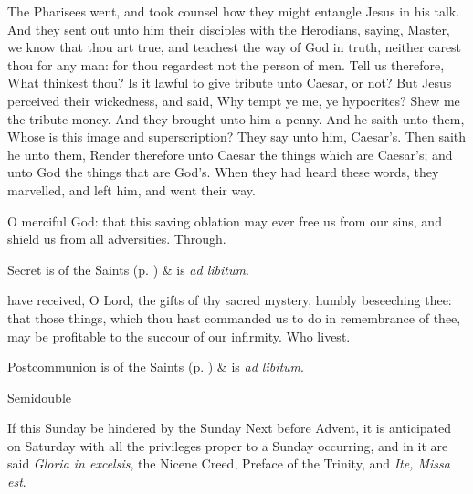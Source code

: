 
 The Pharisees went, and took counsel how they might entangle Jesus in his talk. And they sent out unto him their disciples with the Herodians, saying, Master, we know that thou art true, and teachest the way of God in truth, neither carest thou for any man: for thou regardest not the person of men. Tell us therefore, What thinkest thou? Is it lawful to give tribute unto Caesar, or not? But Jesus perceived their wickedness, and said, Why tempt ye me, ye hypocrites? Shew me the tribute money. And they brought unto him a penny. And he saith unto them, Whose is this image and superscription? They say unto him, Caesar's. Then saith he unto them, Render therefore unto Caesar the things which are Caesar's; and unto God the things that are God's. When they had heard these words, they marvelled, and left him, and went their way.


\secret
{} O merciful God: that this saving oblation may ever free us from our sins, and shield us from all adversities. Through.
\begin{rubric}
     Secret is of the Saints (p. \pageref{SPSaints}) \&  is \emph{ad libitum}.
\end{rubric}


\postcommunion
{} have received, O Lord, the gifts of thy sacred mystery, humbly beseeching thee: that those things, which thou hast commanded us to do in remembrance of thee, may be profitable to the succour of our infirmity. Who livest.
\begin{rubric}
     Postcommunion is of the Saints (p. \pageref{SPSaints}) \&  is \emph{ad libitum}.
\end{rubric}

\begin{inhead}
{Semidouble}
\end{inhead}
\begin{rubric}
If this Sunday be hindered by the Sunday Next before Advent, it is anticipated on Saturday with all the privileges proper to a Sunday occurring, and in it are said \emph{Gloria in excelsis}, the Nicene Creed, Preface of the Trinity, and \emph{Ite, Missa est}.
\end{rubric}
\par\noindent
{}

